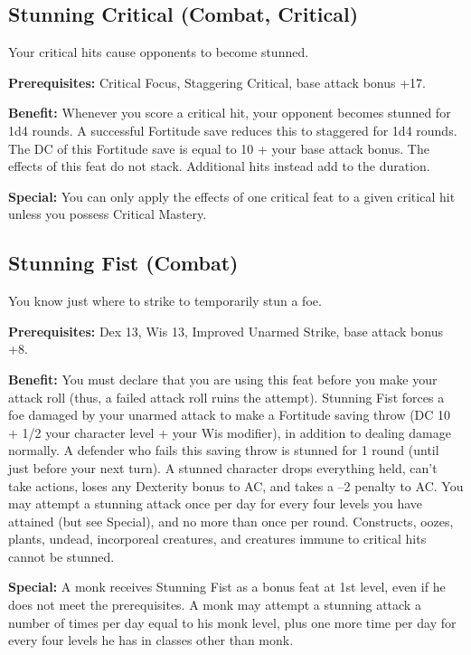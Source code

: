 \subsection{Stunning Critical (Combat, Critical)}

				
Your critical hits cause opponents to become stunned.
				
\textbf{Prerequisites:} Critical Focus, Staggering Critical, base attack bonus +17.
				
\textbf{Benefit:} Whenever you score a critical hit, your opponent becomes stunned for 1d4 rounds. A successful Fortitude save reduces this to staggered for 1d4 rounds. The DC of this Fortitude save is equal to 10 + your base attack bonus. The effects of this feat do not stack. Additional hits instead add to the duration.
				
\textbf{Special:} You can only apply the effects of one critical feat to a given critical hit unless you possess Critical Mastery.
				
\subsection{Stunning Fist (Combat)}

				
You know just where to strike to temporarily stun a foe.
				
\textbf{Prerequisites:} Dex 13, Wis 13, Improved Unarmed Strike, base attack bonus +8.
				
\textbf{Benefit:} You must declare that you are using this feat before you make your attack roll (thus, a failed attack roll ruins the attempt). Stunning Fist forces a foe damaged by your unarmed attack to make a Fortitude saving throw (DC 10 + 1/2 your character level + your Wis modifier), in addition to dealing damage normally. A defender who fails this saving throw is stunned for 1 round (until just before your next turn). A stunned character drops everything held, can't take actions, loses any Dexterity bonus to AC, and takes a --2 penalty to AC. You may attempt a stunning attack once per day for every four levels you have attained (but see Special), and no more than once per round. Constructs, oozes, plants, undead, incorporeal creatures, and creatures immune to critical hits cannot be stunned.
				
\textbf{Special:} A monk receives Stunning Fist as a bonus feat at 1st level, even if he does not meet the prerequisites. A monk may attempt a stunning attack a number of times per day equal to his monk level, plus one more time per day for every four levels he has in classes other than monk.
				

